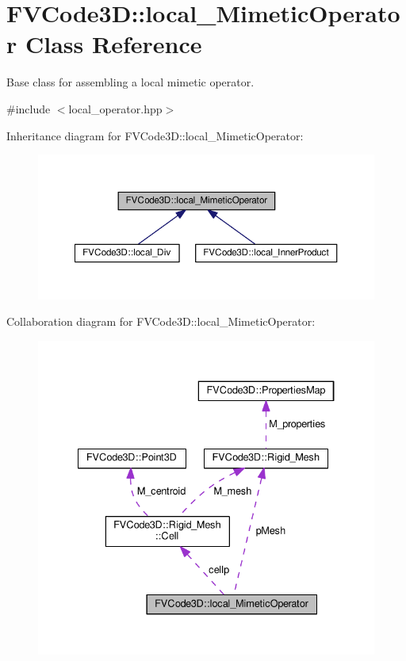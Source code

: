 \hypertarget{classFVCode3D_1_1local__MimeticOperator}{}\section{F\+V\+Code3D\+:\+:local\+\_\+\+Mimetic\+Operator Class Reference}
\label{classFVCode3D_1_1local__MimeticOperator}


Base class for assembling a local mimetic operator.  




{\ttfamily \#include $<$local\+\_\+operator.\+hpp$>$}



Inheritance diagram for F\+V\+Code3D\+:\+:local\+\_\+\+Mimetic\+Operator\+:
\nopagebreak
\begin{figure}[H]
\begin{center}
\leavevmode
\includegraphics[width=350pt]{classFVCode3D_1_1local__MimeticOperator__inherit__graph}
\end{center}
\end{figure}


Collaboration diagram for F\+V\+Code3D\+:\+:local\+\_\+\+Mimetic\+Operator\+:
\nopagebreak
\begin{figure}[H]
\begin{center}
\leavevmode
\includegraphics[width=334pt]{classFVCode3D_1_1local__MimeticOperator__coll__graph}
\end{center}
\end{figure}

